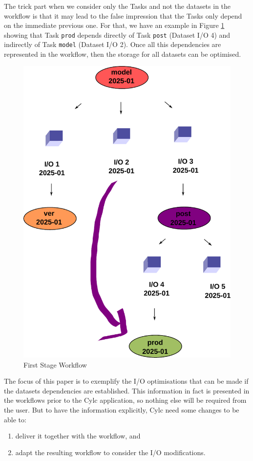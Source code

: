 \documentclass[a4paper]{article}
\begin{document}
The trick part when we consider only the Tasks and not the datasets in the workflow is that it may lead to the false impression that the Tasks only depend on the immediate previous one. For that, we have an example in Figure \ref{fig:cylc-io-model-3} showing that Task \texttt{prod} depends directly of Task \texttt{post} (Dataset I/O 4) and indirectly of Task \texttt{model} (Dataset I/O 2). Once all this dependencies are represented in the workflow, then the storage for all datasets can be optimised.

\begin{figure}[H]
  \centering
  \includegraphics[width=0.6\columnwidth]{cylc-io-model-3}
  \caption{First Stage Workflow}
  \label{fig:cylc-io-model-3}
\end{figure}

The focus of this paper is to exemplify the I/O optimisations that can be made if the datasets dependencies are established. This information in fact is presented in the workflows prior to the Cylc application, so nothing else will be required from the user. But to have the information explicitly, Cylc need some changes to be able to:

\begin{enumerate}

\item deliver it together with the workflow, and

\item adapt the resulting workflow to consider the I/O modifications.

\end{enumerate}
\end{document}
